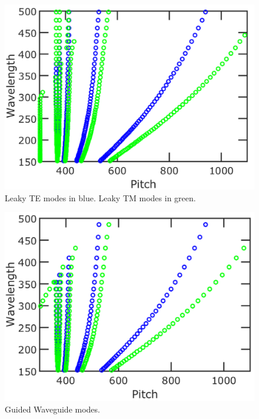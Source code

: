 \documentclass[12pt]{article}
\numberwithin{equation}{section}
\begin{document}
\begin{figure}[H]
\centering 
\includegraphics[scale=.4]{Figures/HemispherePaperWavelength}
\caption{Leaky TE modes in blue.  Leaky TM modes in green.}
\end{figure}

\begin{figure}[H]
\centering 
\vspace{-10pt}
\includegraphics[scale=.4]{Figures/HemispherePaperWavelength2}
\caption{Guided Waveguide modes.}
\vspace{-10pt}
\end{figure}
\end{document}
